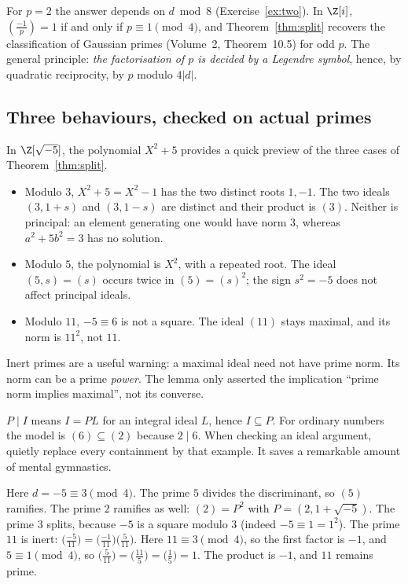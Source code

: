 For $p=2$ the answer depends on $d\bmod8$ (Exercise~\ref{ex:two}). In $\Z[i]$, $\left(\frac{-1}p\right)=1$ if and only if $p\equiv1\pmod4$, and Theorem~\ref{thm:split} recovers the classification of Gaussian primes (Volume~2, Theorem~10.5) for odd $p$. The general principle: \emph{the factorisation of $p$ is decided by a Legendre symbol}, hence, by quadratic reciprocity, by $p$ modulo $4|d|$.

\subsection*{Three behaviours, checked on actual primes}
In $\Z[\sqrt{-5}]$, the polynomial $X^2+5$ provides a quick preview of the
three cases of Theorem~\ref{thm:split}.
\begin{itemize}
\item Modulo $3$, $X^2+5=X^2-1$ has the two distinct roots $1,-1$.
The two ideals $(3,1+s)$ and $(3,1-s)$ are distinct and their product is $(3)$.
Neither is principal: an element generating one would have norm $3$, whereas
$a^2+5b^2=3$ has no solution.
\item Modulo $5$, the polynomial is $X^2$, with a repeated root. The ideal
$(5,s)=(s)$ occurs twice in $(5)=(s)^2$; the sign $s^2=-5$ does not affect
principal ideals.
\item Modulo $11$, $-5\equiv6$ is not a square. The ideal $(11)$ stays maximal,
and its norm is $11^2$, not $11$.
\end{itemize}
Inert primes are a useful warning: a maximal ideal need not have prime norm.
Its norm can be a prime \emph{power}. The lemma only asserted the implication
``prime norm implies maximal'', not its converse.

\begin{reminder}
$P\mid I$ means $I=PL$ for an integral ideal $L$, hence $I\subseteq P$.
For ordinary numbers the model is $(6)\subseteq(2)$ because $2\mid6$.
When checking an ideal argument, quietly replace every containment by that
example. It saves a remarkable amount of mental gymnastics.
\end{reminder}

\begin{examplex}
Here $d=-5\equiv 3\pmod 4$. The prime $5$ divides the discriminant, so $(5)$ ramifies. The prime $2$ ramifies as well: $(2)=P^2$ with $P=(2,1+\sqrt{-5})$. The prime $3$ splits, because $-5$ is a square modulo $3$ (indeed $-5\equiv 1=1^2$). The prime $11$ is inert: $\bigl(\frac{-5}{11}\bigr)=\bigl(\frac{-1}{11}\bigr)\bigl(\frac{5}{11}\bigr)$. Here $11\equiv 3\pmod 4$, so the first factor is $-1$, and $5\equiv 1\pmod 4$, so $\bigl(\frac{5}{11}\bigr)=\bigl(\frac{11}{5}\bigr)=\bigl(\frac{1}{5}\bigr)=1$. The product is $-1$, and $11$ remains prime.
\end{examplex}

